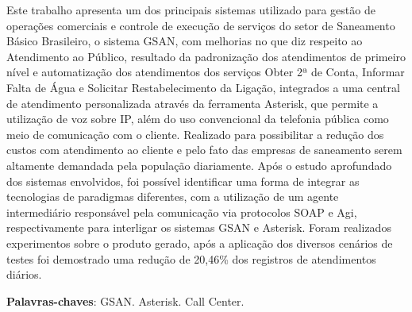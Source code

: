\begin{resumo}
Este trabalho apresenta um dos principais sistemas utilizado para gestão de operações comerciais e controle de execução de serviços do setor de Saneamento Básico Brasileiro, o sistema GSAN, com melhorias no que diz respeito ao Atendimento ao Público, resultado da padronização dos atendimentos de primeiro nível e automatização dos atendimentos dos serviços Obter 2ª de Conta, Informar Falta de Água e Solicitar Restabelecimento da Ligação, integrados a uma central de atendimento personalizada através da ferramenta Asterisk, que permite a utilização de voz sobre IP, além do uso convencional da telefonia pública como meio de comunicação com o cliente. Realizado para possibilitar a redução dos custos com atendimento ao cliente e pelo fato das empresas de saneamento serem altamente demandada pela população diariamente. Após o estudo aprofundado dos sistemas envolvidos, foi possível identificar uma forma de integrar as tecnologias de paradigmas diferentes, com a utilização de um agente intermediário responsável pela comunicação via protocolos SOAP e Agi, respectivamente para interligar os sistemas GSAN e Asterisk.  Foram realizados experimentos sobre o produto gerado, após a aplicação dos diversos cenários de testes foi demostrado uma redução de 20,46\% dos registros de atendimentos diários.

 \vspace{\onelineskip}
    
 \noindent
 \textbf{Palavras-chaves}: GSAN. Asterisk. Call Center.
\end{resumo}
